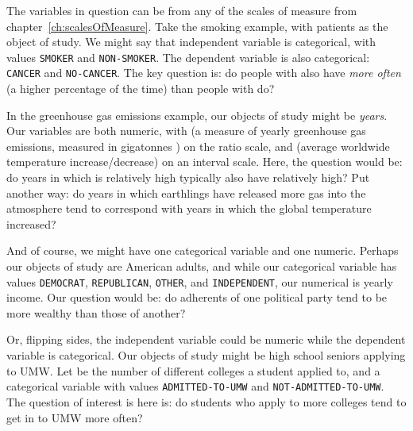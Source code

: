 
The variables in question can be from any of the scales of measure from
chapter~\ref{ch:scalesOfMeasure}. Take the smoking example, with patients as
the object of study. We might say that independent variable  is categorical,
with values \texttt{SMOKER} and \texttt{NON-SMOKER}. The dependent variable 
is also categorical: \texttt{CANCER} and \texttt{NO-CANCER}. The key question
is: do people with  also have 
\textit{more often} (a higher percentage of the time) than people with
 do?


In the greenhouse gas emissions example, our objects of study might be
\textit{years}. Our variables are both numeric, with  (a measure of yearly
greenhouse gas emissions, measured in gigatonnes ) on the ratio
scale, and  (average worldwide temperature increase/decrease) on an interval
scale. Here, the question would be: do years in which  is relatively high
typically also have  relatively high? Put another way: do years in which
earthlings have released more gas into the atmosphere tend to correspond with
years in which the global temperature increased?

And of course, we might have one categorical variable and one numeric. Perhaps
our objects of study are American adults, and while our categorical 
variable has values \texttt{DEMOCRAT}, \texttt{REPUBLICAN}, \texttt{OTHER}, and
\texttt{INDEPENDENT}, our numerical  is yearly income. Our question would
be: do adherents of one political party tend to be more wealthy than those of
another?

Or, flipping sides, the independent variable  could be numeric while the
dependent variable  is categorical. Our objects of study might be high
school seniors applying to UMW. Let  be the number of different colleges a
student applied to, and  a categorical variable with values
\texttt{ADMITTED-TO-UMW} and \texttt{NOT-ADMITTED-TO-UMW}. The question of
interest is here is: do students who apply to more colleges tend to get in to
UMW more often?

